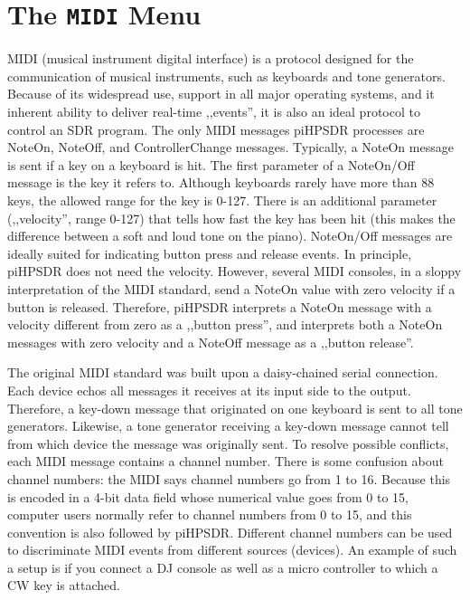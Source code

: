 \documentclass[12pt]{book}
\def\pH{pi\-HPSDR\xspace}
\begin{document}
\section{The \texttt{MIDI} Menu}
\label{sec:midimenu}
MIDI (musical instrument digital interface) is a protocol designed for the communication of
musical instruments, such as keyboards and tone generators. Because of its widespread use,
support in all major operating systems, and it inherent ability to deliver real-time ,,events'',
it is also an ideal protocol to control an SDR program. The only MIDI messages \pH processes
are NoteOn, NoteOff, and ControllerChange messages. Typically, a NoteOn message is sent if
a key on a keyboard is hit. The first parameter of a NoteOn/Off message is the key
it refers to. Although keyboards rarely have more than 88 keys, the allowed range for
the key is 0-127. There is an additional parameter (,,velocity'', range 0-127) that tells how
fast the key has been hit (this makes the difference between a soft and loud tone on the piano).
NoteOn/Off messages are ideally suited for indicating button press and release events. In principle,
\pH does not need the velocity. However, several MIDI consoles, in a sloppy interpretation of
the MIDI standard, send a NoteOn value with zero velocity if a button is released. Therefore,
\pH interprets a NoteOn message with a velocity different from zero as a ,,button press'',
and interprets both a NoteOn messages with zero velocity and a NoteOff message as a ,,button release''.

The original MIDI standard was built upon a daisy-chained serial connection. Each device
echos all messages it receives at its input side to the output. Therefore, a key-down
message that originated on one keyboard is sent to all tone generators. Likewise, a tone
generator receiving a key-down message cannot tell from which device the message
was originally sent. To resolve possible conflicts, each MIDI message contains a channel
number. There is some confusion about channel numbers: the MIDI says channel numbers
go from 1 to 16. Because this is encoded in a 4-bit data field whose numerical value
goes from 0 to 15, computer users normally refer to channel numbers from 0 to 15,
and this convention is also followed by \pH. Different channel numbers can be used
to discriminate MIDI events from different sources (devices). An example of such a setup
is if you connect a DJ console as well as a micro controller to which a CW key is attached.
\end{document}

